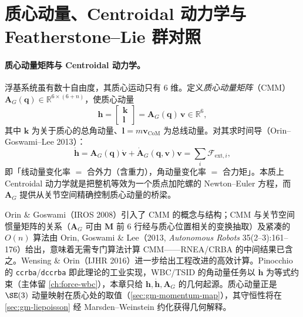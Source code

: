 \section{质心动量、Centroidal 动力学与 Featherstone--Lie 群对照}
\label{sec:gm-centroidal}

\paragraph{质心动量矩阵与 Centroidal 动力学。}
浮基系统虽有数十自由度，其质心运动只有 $6$ 维。定义\emph{质心动量矩阵}（CMM）$\mathbf A_G(\mathbf q)\in\mathbb R^{6\times(6+n)}$，使质心动量
\begin{equation}
  \mathbf h=\begin{bmatrix}\mathbf k\\ \mathbf l\end{bmatrix}=\mathbf A_G(\mathbf q)\,\mathbf v\in\mathbb R^6,
  \label{eq:gm-cmm}
\end{equation}
其中 $\mathbf k$ 为关于质心的总角动量、$\mathbf l=m\mathbf v_{\mathrm{CoM}}$ 为总线动量。对其求时间导（Orin--Goswami--Lee 2013\cite{orin2013centroidal}）：
\begin{equation}
  \dot{\mathbf h}=\mathbf A_G(\mathbf q)\dot{\mathbf v}+\dot{\mathbf A}_G(\mathbf q,\mathbf v)\mathbf v=\sum_i\boldsymbol{\mathcal F}_{\mathrm{ext},i},
  \label{eq:gm-centroidal}
\end{equation}
即「线动量变化率 $=$ 合外力（含重力），角动量变化率 $=$ 合力矩」。本质上 Centroidal 动力学就是把整机等效为一个质点加陀螺的 Newton--Euler 方程，而 $\mathbf A_G$ 提供从关节空间精确控制质心动量的桥梁。

\begin{remark}
Orin \& Goswami（IROS 2008）引入了 CMM 的概念与结构；CMM 与关节空间惯量矩阵的关系（$\mathbf A_G$ 可由 $\mathbf M$ 前 6 行经与质心位置相关的变换抽取）及紧凑的 $O(n)$ 算法由 Orin, Goswami \& Lee（2013, \emph{Autonomous Robots} 35(2--3):161--176\cite{orin2013centroidal}）给出，意味着无需专门算法计算 CMM——RNEA/CRBA 的中间结果已含之。Wensing \& Orin（IJHR 2016）进一步给出工程改进的高效计算。Pinocchio 的 \texttt{ccrba}/\allowbreak\texttt{dccrba} 即此理论的工业实现，WBC/TSID 的角动量任务以 $\dot{\mathbf h}$ 为等式约束（主体留 \cref{ch:force-wbc}），本章只给 $\mathbf h,\dot{\mathbf h},\mathbf A_G$ 的几何起源。质心动量正是 $\SE(3)$ 动量映射在质心处的取值（\cref{sec:gm-momentum-map}），其守恒性将在 \cref{sec:gm-liepoisson} 经 Marsden--Weinstein 约化获得几何解释。
\end{remark}

